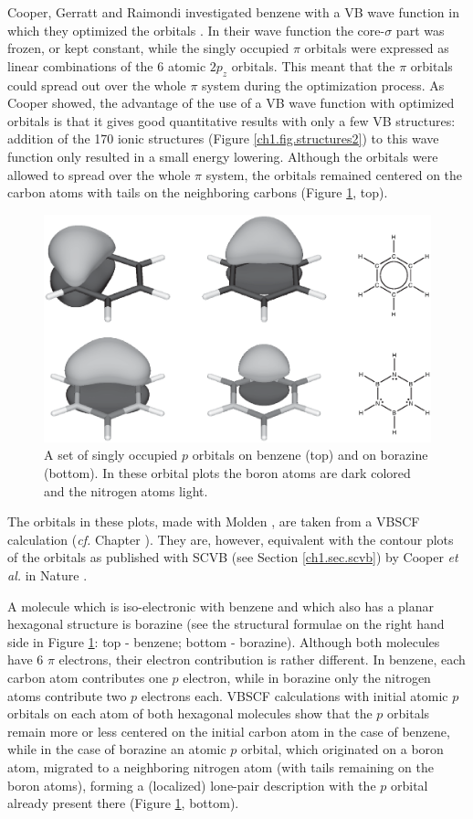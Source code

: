 Cooper, Gerratt and Raimondi investigated benzene with a VB wave function in which they optimized the orbitals \cite{nature}. In their wave function the core-$\sigma$ part was frozen, or kept constant, while the singly occupied $\pi$ orbitals were expressed as linear combinations of the 6 atomic $2p_z$ orbitals. This meant that the $\pi$ orbitals could spread out over the whole $\pi$ system during the optimization process. As Cooper showed, the advantage of the use of a VB wave function with optimized orbitals is that it gives good quantitative results with only a few VB structures: addition of the 170 ionic structures (Figure \ref{ch1.fig.structures2}) to this wave function only resulted in a small energy lowering. Although the orbitals were allowed to spread over the whole $\pi$ system, the orbitals remained centered on the carbon atoms with tails on the neighboring carbons (Figure \ref{ch1.fig6}, top). 
\begin{figure}[htbp]
\center
\includegraphics[scale=0.5]{introduction/figures/figure6.eps}
\caption{A set of singly occupied $p$ orbitals on benzene (top) and on borazine (bottom). In these orbital plots the boron atoms are dark colored and the nitrogen atoms light.}
\label{ch1.fig6}
\end{figure}
The orbitals in these plots, made with Molden \cite{molden}, are taken from a VBSCF calculation (\textit{cf.} Chapter \chinorganic). They are, however, equivalent with the contour plots of the orbitals as published with SCVB (see Section \ref{ch1.sec.scvb}) by Cooper \textit{et al.} in Nature \cite{nature}.

A molecule which is iso-electronic with benzene and which also has a planar hexagonal structure is borazine (see the structural formulae on the right hand side in Figure \ref{ch1.fig6}: top - benzene; bottom - borazine). Although both molecules have 6 $\pi$ electrons, their electron contribution is rather different. In benzene, each carbon atom contributes one $p$ electron, while in borazine only the nitrogen atoms contribute two $p$ electrons each. VBSCF calculations with initial atomic $p$ orbitals on each atom of both hexagonal molecules show that the $p$ orbitals remain more or less centered on the initial carbon atom in the case of benzene,  while in the case of borazine an atomic $p$ orbital, which originated on a boron atom, migrated to a neighboring nitrogen atom (with tails remaining on the boron atoms), forming a (localized) lone-pair description with the $p$ orbital already present there (Figure \ref{ch1.fig6}, bottom).

